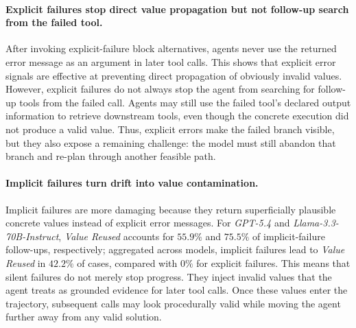 \paragraph{Explicit failures stop direct value propagation but not follow-up search from the failed tool.}
After invoking explicit-failure block alternatives, agents never use the returned error message as an argument in later tool calls.
This shows that explicit error signals are effective at preventing direct propagation of obviously invalid values.
However, explicit failures do not always stop the agent from searching for follow-up tools from the failed call.
Agents may still use the failed tool's declared output information to retrieve downstream tools, even though the concrete execution did not produce a valid value.
Thus, explicit errors make the failed branch visible, but they also expose a remaining challenge: the model must still abandon that branch and re-plan through another feasible path.



\paragraph{Implicit failures turn drift into value contamination.}
Implicit failures are more damaging because they return superficially plausible concrete values instead of explicit error messages.
For \textit{GPT-5.4} and \textit{Llama-3.3-70B-Instruct}, \textit{Value Reused} accounts for $55.9\%$ and $75.5\%$ of implicit-failure follow-ups, respectively; aggregated across models, implicit failures lead to \textit{Value Reused} in $42.2\%$ of cases, compared with $0\%$ for explicit failures.
This means that silent failures do not merely stop progress.
They inject invalid values that the agent treats as grounded evidence for later tool calls.
Once these values enter the trajectory, subsequent calls may look procedurally valid while moving the agent further away from any valid solution.


